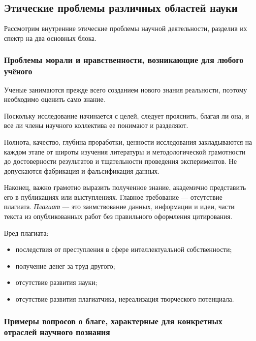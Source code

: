 \subsection{Этические проблемы различных областей науки}

Рассмотрим внутренние этические проблемы научной
деятельности, разделив их спектр на два основных блока. 

\subsubsection{Проблемы морали и нравственности,
возникающие для любого учёного}

Ученые занимаются прежде всего созданием нового знания
реальности, поэтому необходимо оценить само знание. 

Поскольку исследование начинается с целей, следует прояснить, благая ли она, и все ли члены научного коллектива ее понимают и разделяют.

Полнота, качество, глубина проработки, ценности исследования закладываются на каждом
этапе от широты изучения литературы и методологической грамотности до достоверности результатов и тщательности проведения экспериментов. Не допускаются фабрикация и фальсификация данных. 

Наконец, важно грамотно выразить полученное знание, академично представить его в публикациях или выступлениях. Главное требование --- отсутствие плагиата. \textit{Плагиат} --- это заимствование данных, информации и идеи, части текста из опубликованных работ без правильного оформления цитирования.

Вред плагиата:
\begin{itemize}
    \item последствия от преступления в сфере интеллектуальной собственности;
    \item получение денег за труд другого;
    \item отсутствие развития науки;
    \item отсутствие развития плагиатчика, нереализация творческого потенциала.
\end{itemize}

\subsubsection{Примеры вопросов о благе,
характерные для конкретных отраслей научного познания}

